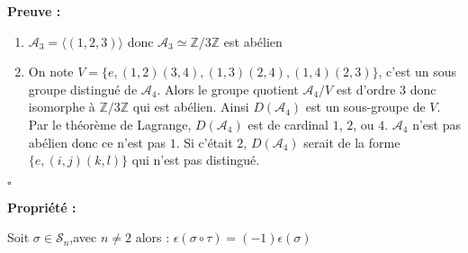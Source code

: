 \documentclass{report}
\renewenvironment{leftbar}{%
  \def\FrameCommand{\vrule width 0.4pt \hspace{10pt}}%
  \MakeFramed {\advance\hsize-\width \FrameRestore}}%
 {\endMakeFramed}%
\newenvironment{preuve}{\vspace*{0.5cm}
    \begin{leftbar}
    \noindent\textbf{Preuve :}\par}{
    \begin{flushright}
    $\square$
    \end{flushright}
    \end{leftbar}
}
\newenvironment{prop}{\begin{tcolorbox}[colframe= white]
    \textbf{Propriété :}
     \par}
    {\end{tcolorbox}}
\newcommand{\Z}{\mathbb{Z}}
\newcommand{\sn}{\mathcal{S}_{n}}
\newcommand{\sign}{\epsilon(\sigma)}
\begin{document}
\begin{preuve}
\begin{enumerate}
\item $\mathcal{A}_3 = \langle (1,2,3) \rangle$ donc $\mathcal{A}_3\simeq \Z/3\Z$ est abélien
\item On note $V = \{e,(1,2)(3,4),(1,3)(2,4),(1,4)(2,3)\}$, c'est un sous groupe distingué de $\mathcal{A}_4$. Alors le groupe quotient $\mathcal{A}_4/V$ est d'ordre 3 donc isomorphe à $\Z/3\Z$ qui est abélien. Ainsi $D(\mathcal{A}_4)$ est un sous-groupe de $V$. Par le théorème de Lagrange, $D(\mathcal{A}_4)$ est de cardinal $1$, $2$, ou $4$. $\mathcal{A}_4$ n'est pas abélien donc ce n'est pas $1$. Si c'était $2$, $D(\mathcal{A}_4)$ serait de la forme $\{e, (i,j)(k,l)\}$ qui n'est pas distingué.
\end{enumerate}
\end{preuve}

\begin{prop}
Soit $\sigma \in \sn$,avec $n\neq2 $ alors : $\epsilon(\sigma\circ\tau) = (-1)\sign$
\end{prop}
\end{document}
